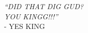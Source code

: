 \clearpage
{}%

\begin{Center}
	\centering \MakeUppercase {\textit{“Did that dig gud?\\ YOU KINGG!!!”}}\\
	- YES KING 
\end{Center}
 
\clearpage